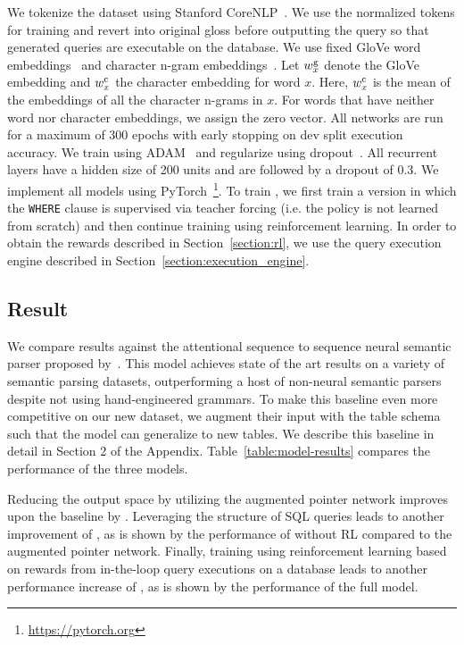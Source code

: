\documentclass{article} %
\begin{document}
We tokenize the dataset using Stanford CoreNLP~\citep{corenlp}.
We use the normalized tokens for training and revert into original gloss before outputting the query so that generated queries are executable on the database.
We use fixed GloVe word embeddings~\citep{Pennington2014GloveGV} and character n-gram embeddings~\citep{arXiv-2016-HASHIMOTO-jmt}.
Let $w^{\rm g}_x$ denote the GloVe embedding and $w^{\rm c}_x$ the character embedding for word $x$.
Here, $w^{\rm c}_x$ is the mean of the embeddings of all the character n-grams in $x$.
For words that have neither word nor character embeddings, we assign the zero vector.
All networks are run for a maximum of 300 epochs with early stopping on dev split execution accuracy.
We train using ADAM~\citep{Kingma2014AdamAM} and regularize using dropout~\citep{Srivastava2014DropoutAS}.
All recurrent layers have a hidden size of 200 units and are followed by a dropout of 0.3.
We implement all models using PyTorch~\footnote{\url{https://pytorch.org}}.
To train \model, we first train a version in which the \texttt{WHERE} clause is supervised via teacher forcing (i.e. the policy is not learned from scratch) and then continue training using reinforcement learning.
In order to obtain the rewards described in Section~\ref{section:rl}, we use the query execution engine described in Section~\ref{section:execution_engine}.



\subsection{Result}
\vspace{-2mm}

We compare results against the attentional sequence to sequence neural semantic parser proposed by~\citet{dong-neural_semantic_parsing}.
This model achieves state of the art results on a variety of semantic parsing datasets, outperforming a host of non-neural semantic parsers despite not using hand-engineered grammars.
To make this baseline even more competitive on our new dataset, we augment their input with the table schema such that the model can generalize to new tables.
We describe this baseline in detail in Section 2 of the Appendix.
Table~\ref{table:model-results} compares the performance of the three models.

Reducing the output space by utilizing the augmented pointer network improves upon the baseline by \perfdiffpointervsseqtoseq.
Leveraging the structure of SQL queries leads to another improvement of \perfdiffoursnorlvspointer, as is shown by the performance of \model without RL compared to the augmented pointer network. Finally, training using reinforcement learning based on rewards from in-the-loop query executions on a database leads to another performance increase of \perfdiffoursvsoursnorl, as is shown by the performance of the full \model model.
\end{document}
